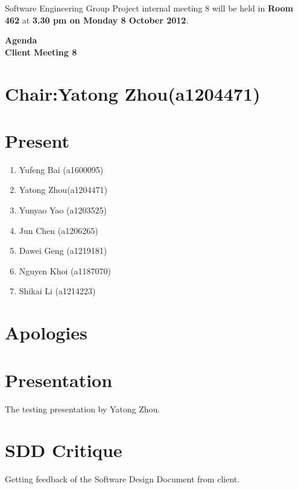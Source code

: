 \documentclass[11pt, a4paper]{article}
\begin{document}
\noindent Software Engineering Group Project internal meeting 8 will be held in {\bf Room 462} at {\bf 3.30 pm on Monday 8 October 2012}.


\vspace*{15pt}

\begin{center}
\huge \bf Agenda \\Client Meeting 8
\end{center}



\section*{Chair:Yatong Zhou(a1204471)}
\section*{Present}
\begin{enumerate}
\item Yufeng Bai (a1600095)
\item Yatong Zhou(a1204471)
\item Yunyao Yao (a1203525)
\item Jun Chen (a1206265)
\item Dawei Geng (a1219181)
\item Nguyen Khoi (a1187070)
\item Shikai Li (a1214223)
\end{enumerate}
\section{Apologies}

\section{Presentation}
The testing presentation by Yatong Zhou.

\section{SDD Critique}
Getting feedback of the Software Design Document from client. 
\end{document}
